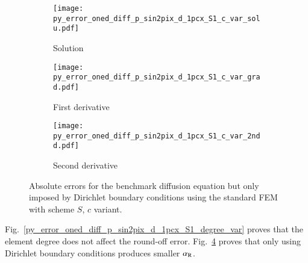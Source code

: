 \documentclass[review,3p]{elsarticle}
\begin{document}
\begin{figure}[!ht]
    \begin{subfigure}{5.5cm}
        \texttt{[image: py\_error\_oned\_diff\_p\_sin2pix\_d\_1pcx\_S1\_c\_var\_solu.pdf]}
        \caption{Solution}
        \label{py_error_oned_diff_p_sin2pix_d_1pcx_S1_c_var_solu}
    \end{subfigure}
    \hspace{-0.2cm}
    \begin{subfigure}{5.5cm}
        \texttt{[image: py\_error\_oned\_diff\_p\_sin2pix\_d\_1pcx\_S1\_c\_var\_grad.pdf]}
        \caption{First derivative}
        \label{py_error_oned_diff_p_sin2pix_d_1pcx_S1_c_var_grad}
    \end{subfigure}
    \hspace{-0.2cm}
    \begin{subfigure}{5.5cm}
        \texttt{[image: py\_error\_oned\_diff\_p\_sin2pix\_d\_1pcx\_S1\_c\_var\_2ndd.pdf]}
        \caption{Second derivative}
        \label{py_error_oned_diff_p_sin2pix_d_1pcx_S1_c_var_2ndd}
    \end{subfigure}
\caption{Absolute errors for the benchmark diffusion equation but only imposed by Dirichlet boundary conditions using the standard FEM with scheme $S$, $c$ variant.}
\label{py_error_oned_diff_p_sin2pix_d_1pcx_S1_c_var}
\end{figure}

Fig.~\ref{py_error_oned_diff_p_sin2pix_d_1pcx_S1_degree_var} proves that the element degree does not affect the round-off error.
Fig.~\ref{py_error_oned_diff_p_sin2pix_d_1pcx_S1_c_var} proves that only using Dirichlet boundary conditions produces smaller $\alpha_{\rm R}$.
\end{document}
